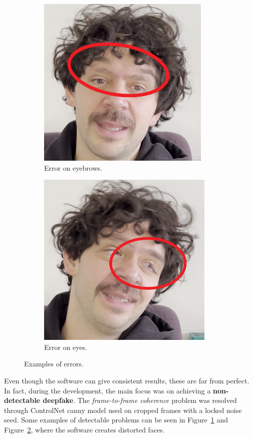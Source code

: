\documentclass[preprint]{elsarticle}
\begin{document}
\begin{figure}[b]
	\centering
	\begin{subfigure}[b]{0.5\textwidth}
		\centering
		\includegraphics[scale=0.34]{img/project_img/error-eyebrows.png}
		\caption{Error on eyebrows.}\label{fig:error-eyebrows}
	\end{subfigure}%
	\hfill
	\begin{subfigure}[b]{0.5\textwidth}
		\centering
		\includegraphics[scale=0.34]{img/project_img/error-eyes.png}
		\caption{Error on eyes.}\label{fig:error-eyes}
	\end{subfigure}
	\caption{Examples of errors.}\label{fig:errors}
\end{figure}

Even though the software can give consistent results, these are far from perfect. In fact, during the development, the main focus was on achieving a \textbf{non-detectable deepfake}. The \emph{frame-to-frame coherence} problem was resolved through ControlNet  canny model used on cropped frames with a locked noise seed.  Some examples of detectable problems can be seen in Figure~\ref{fig:error-eyebrows} and Figure~\ref{fig:error-eyes},  where the software creates distorted faces. 
\end{document}
